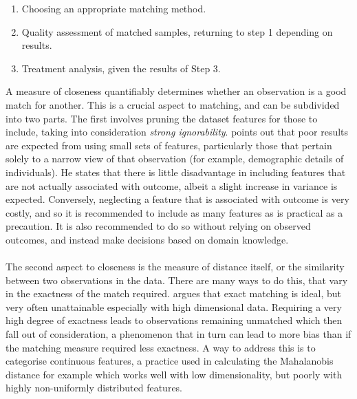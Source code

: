 {\begin {enumerate}
\item{Choosing an appropriate matching method.}
\item{Quality assessment of matched samples, returning to step 1 depending on results.}
\item{Treatment analysis, given the results of Step 3.}
\end{enumerate}
A measure of closeness quantifiably determines whether an observation is a good match for another. This is a crucial aspect to matching, and can be subdivided into two parts. The first involves pruning the dataset features for those to include, taking into consideration {\it strong ignorability}. \cite{stuart2010matching} points out that poor results are expected from using small sets of features, particularly those that pertain solely to a narrow view of that observation (for example, demographic details of individuals). He states that there is little disadvantage in including features that are not actually associated with outcome, albeit a slight increase in variance is expected. Conversely, neglecting a feature that is associated with outcome is very costly, and so it is recommended to include as many features as is practical as a precaution. It is also recommended to do so without relying on observed outcomes, and instead make decisions based on domain knowledge. \\\\
The second aspect to closeness is the measure of distance itself, or the similarity between two observations in the data. There are many ways to do this, that vary in the exactness of the match required. \cite{stuart2010matching} argues that exact matching is ideal, but very often unattainable especially with high dimensional data. Requiring a very high degree of exactness leads to observations remaining unmatched which then fall out of consideration, a phenomenon that in turn can lead to more bias than if the matching measure required less exactness. A way to address this is to categorise continuous features, a practice used in calculating the Mahalanobis distance for example which works well with low dimensionality, but poorly with highly non-uniformly distributed features.
\\\\ 
}

